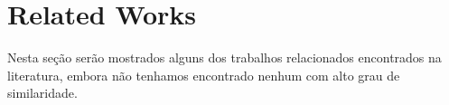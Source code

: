 \section{Related Works}
\label{sec:related_works}

 Nesta seção serão mostrados alguns dos trabalhos relacionados encontrados na literatura, embora não tenhamos encontrado nenhum com alto grau de similaridade.
 
 